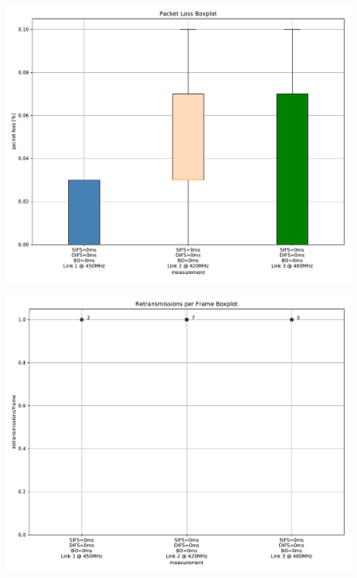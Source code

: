 \documentclass{article}
\begin{document}
\begin{figure}
	\includegraphics[width=\textwidth]{no_wait_single/boxplot/packet_loss_boxplot}
\end{figure}

\begin{figure}
	\includegraphics[width=\textwidth]{no_wait_single/boxplot/retransmissions_per_frame_boxplot}
\end{figure}
\end{document}
